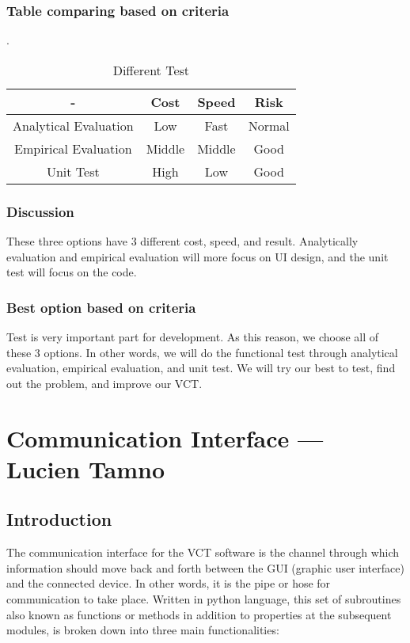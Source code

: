 \documentclass [10pt]{article}
\begin{document}
\subsubsection{Table comparing based on criteria}
.
\begin{table}[h]
\caption{Different Test}
\label{table_example}
\begin{center}
\begin{tabular}{|c||c||c||c|}
\hline
 - & Cost & Speed & Risk \\
\hline
Analytical Evaluation & Low & Fast & Normal \\
\hline
Empirical Evaluation & Middle & Middle & Good \\
\hline
Unit Test & High & Low & Good \\
\hline
\end{tabular}
\end{center}
\end{table}

\subsubsection{Discussion}
These three options have 3 different cost, speed, and result. Analytically evaluation and empirical evaluation will more focus on UI design, and the unit test will focus on the code. 

\subsubsection{Best option based on criteria}
Test is very important part for development. As this reason, we choose all of these 3 options. In other words, we will do the functional test through analytical evaluation, empirical evaluation, and unit test. We will try our best to test, find out the problem, and improve our VCT.


\newpage
\section{Communication Interface --- Lucien Tamno}

\subsection{\textbf{Introduction}}
 
The communication interface for the VCT software is the channel through which information should move back and forth between the GUI (graphic user interface) and the connected device. In other words, it is the pipe or hose for communication to take place. Written in python language, this set of subroutines also known as functions or methods in addition to properties at the subsequent modules, is broken down into three main functionalities:
\end{document}
